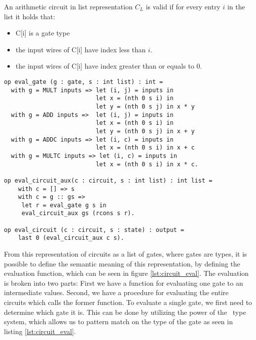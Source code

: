 
\begin{definition}
  \label{def:decomp:valid_circuit}
  An arithmetic circuit in list representation $C_{L}$ is valid if for every
  entry $i$ in the list it holds that:
    \begin{itemize}
      \item C[i] is a gate type
      \item the input wires of C[i] have index less than $i$.
      \item the input wires of C[i] have index greater than or equals to $0$.
    \end{itemize}
\end{definition}

\begin{lstlisting}[float,label=lst:circuit_eval,caption=Circuit evaluation function]
op eval_gate (g : gate, s : int list) : int =
  with g = MULT inputs => let (i, j) = inputs in
                          let x = (nth 0 s i) in
                          let y = (nth 0 s j) in x * y
  with g = ADD inputs =>  let (i, j) = inputs in
                          let x = (nth 0 s i) in
                          let y = (nth 0 s j) in x + y
  with g = ADDC inputs => let (i, c) = inputs in
                          let x = (nth 0 s i) in x + c
  with g = MULTC inputs => let (i, c) = inputs in
                          let x = (nth 0 s i) in x * c.

op eval_circuit_aux(c : circuit, s : int list) : int list =
    with c = [] => s
    with c = g :: gs =>
     let r = eval_gate g s in
     eval_circuit_aux gs (rcons s r).

op eval_circuit (c : circuit, s : state) : output =
    last 0 (eval_circuit_aux c s).
\end{lstlisting}

From this representation of circuits as a list of gates, where gates are types,
it is possible to define the semantic meaning of this representation, by
defining the evaluation function, which can be seen in figure \ref{lst:circuit_eval}.
The evaluation is broken into two parts: First we have a function for evaluating
one gate to an intermediate values. Second, we have a procedure for evaluating
the entire circuits which calls the former function.
To evaluate a single gate, we first need to determine which gate it is. This can
be done by utilizing the power of the \easycrypt\ type system, which allows us
to pattern match on the type of the gate as seen in listing \ref{lst:circuit_eval}.


